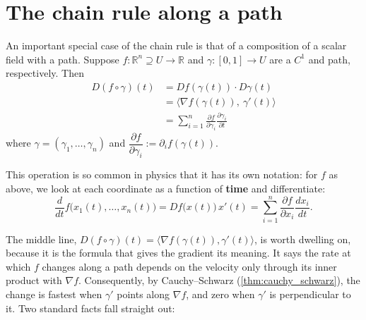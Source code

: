 
\section{The chain rule along a path}
\label{sec:chain_rule_along_path}

An important special case of the chain rule is that of a composition of a scalar field with a
path. Suppose $f : \mathbb{R}^n \supseteq U \to \mathbb{R}$ and
$\gamma : [0,1]\to U$ are a $C^1$   and
path, respectively. Then
\[
\begin{aligned}
D(f\circ\gamma)(t) &= Df(\gamma(t))\cdot D\gamma(t) \\
&= \langle \nabla f(\gamma(t)),\ \gamma'(t)\rangle \\
&= \sum_{i=1}^{n} \frac{\partial f}{\partial \gamma_i}\frac{\partial \gamma_i}{\partial t}
\end{aligned}
\]
where $\gamma = (\gamma_1,\dots,\gamma_n)$ and
$\dfrac{\partial f}{\partial \gamma_i} := \partial_i f(\gamma(t))$.

This operation is so common in physics that it has its own notation: for $f$ as above, we look at
each coordinate as a function of \textbf{time} and differentiate:
\[\frac{d}{dt}f\big(x_1(t),\dots,x_n(t)\big) = Df\big(x(t)\big)\,x'(t) = \sum_{i=1}^{n}\frac{\partial f}{\partial x_i}\frac{dx_i}{dt}.\]

The middle line, $D(f\circ\gamma)(t) = \langle\nabla f(\gamma(t)),\gamma'(t)\rangle$, is worth
dwelling on, because it is the formula that gives the gradient its meaning. It says the rate at
which $f$ changes along a path depends on the velocity only through its inner product with
$\nabla f$. Consequently, by Cauchy--Schwarz (\cref{thm:cauchy_schwarz}), the change is fastest
when $\gamma'$ points along $\nabla f$, and zero when $\gamma'$ is perpendicular to it. Two
standard facts fall straight out:

